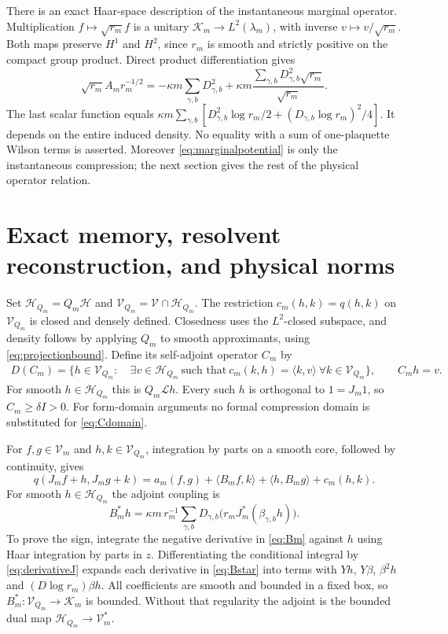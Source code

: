 \documentclass[11pt]{article}
\newcommand{\HH}{\mathscr H}
\newcommand{\KK}{\mathscr K}
\newcommand{\LL}{\mathscr L}
\newcommand{\VV}{\mathscr V}
\begin{document}
There is an exact Haar-space description of the instantaneous marginal
operator. Multiplication $f\mapsto\sqrt{r_m}f$ is a unitary
$\KK_m\to L^2(\lambda_m)$, with inverse
$v\mapsto v/\sqrt{r_m}$. Both maps preserve $H^1$ and $H^2$,
since $r_m$ is smooth and strictly positive on the compact group
product. Direct product differentiation gives
\begin{equation}\label{eq:marginalpotential}
 \sqrt{r_m}A_m r_m^{-1/2}
 =-\kappa m\sum_{\gamma,b}D_{\gamma,b}^2
       +\kappa m\frac{\sum_{\gamma,b}D_{\gamma,b}^2\sqrt{r_m}}{\sqrt{r_m}}.
\end{equation}
The last scalar function equals
$\kappa m\sum_{\gamma,b}[D_{\gamma,b}^2\log r_m/2
 +(D_{\gamma,b}\log r_m)^2/4]$.
It depends on the entire induced density. No equality with a sum of
one-plaquette Wilson terms is asserted. Moreover \eqref{eq:marginalpotential}
is only the instantaneous compression; the next section gives the rest
of the physical operator relation.

\section{Exact memory, resolvent reconstruction, and physical norms}

Set $\HH_{Q_m}=Q_m\HH$ and $\VV_{Q_m}=\VV\cap\HH_{Q_m}$.
The restriction $c_m(h,k)=q(h,k)$ on $\VV_{Q_m}$ is closed and densely
defined. Closedness uses the $L^2$-closed subspace, and density follows
by applying $Q_m$ to smooth approximants, using \eqref{eq:projectionbound}.
Define its self-adjoint operator $C_m$ by
\begin{align}\label{eq:Cdomain}
 D(C_m)=\{h\in\VV_{Q_m}:&\ \exists v\in\HH_{Q_m}\ \text{such that}
 \ c_m(k,h)=\langle k,v\rangle\ \forall k\in\VV_{Q_m}\},
 \qquad C_mh=v.
\end{align}
For smooth $h\in\HH_{Q_m}$ this is $Q_m\LL h$.
Every such $h$ is orthogonal to $1=J_m1$, so $C_m\geq\delta I>0$.
For form-domain arguments no formal compression domain is substituted
for \eqref{eq:Cdomain}.

For $f,g\in\VV_m$ and $h,k\in\VV_{Q_m}$, integration by parts on a
smooth core, followed by continuity, gives
\begin{equation}\label{eq:block}
 q(J_mf+h,J_mg+k)=a_m(f,g)+\langle B_mf,k\rangle
                         +\langle h,B_mg\rangle+c_m(h,k).
\end{equation}
For smooth $h\in\HH_{Q_m}$ the adjoint coupling is
\begin{equation}\label{eq:Bstar}
 B_m^*h=\kappa m\,r_m^{-1}\sum_{\gamma,b}
           D_{\gamma,b}\bigl(r_mJ_m^*(\beta_{\gamma,b}h)\bigr).
\end{equation}
To prove the sign, integrate the negative derivative in \eqref{eq:Bm}
against $h$ using Haar integration by parts in $z$. Differentiating the
conditional integral by \eqref{eq:derivativeJ} expands each derivative
in \eqref{eq:Bstar} into terms with $Yh$, $Y\beta$, $\beta^2h$ and
$(D\log r_m)\beta h$. All coefficients are smooth and bounded in a fixed
box, so $B_m^*:\VV_{Q_m}\to\KK_m$ is bounded. Without that regularity
the adjoint is the bounded dual map $\HH_{Q_m}\to\VV_m^*$.
\end{document}
